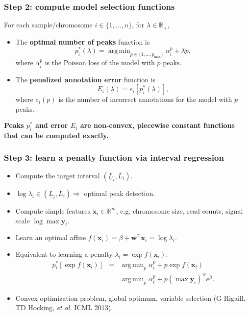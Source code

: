 \documentclass{beamer}
\DeclareMathOperator*{\argmin}{arg\,min}
\DeclareMathOperator*{\minimize}{minimize}
\newcommand{\RR}{\mathbb R}
\begin{document}
\begin{frame}
  \frametitle{Step 2: compute model selection functions}
  For each sample/chromosome $i\in\{1, \dots, n\}$, for $\lambda\in\RR_+$,
  \begin{itemize}
  \item   The \textbf{optimal number of peaks} function is
  \begin{equation*}
    p_i^*(\lambda) = \argmin_{p\in\{1,\dots, p_{\text{max}}\}}
      \alpha_i^p + \lambda p,
  \end{equation*}
  where  $\alpha_i^p$ is the Poisson loss of the model with $p$ peaks.
  \item The \textbf{penalized annotation error} function is
  \begin{equation*}
    E_i(\lambda) = e_i\left[ p_i^*(\lambda) \right],
  \end{equation*}
  where $e_i(p)$ is the number of incorrect annotations for the model
  with $p$ peaks.
  \end{itemize}
  \textbf{Peaks $p_i^*$ and error $E_i$ are non-convex, piecewise
    constant functions that can be computed exactly.}
\end{frame}
 
\begin{frame}
  \frametitle{Step 3: learn a penalty function via interval regression}
  \begin{itemize}
  \item Compute the target interval $(\underline L_i, \overline
    L_i)$.
  \item $\log \lambda_i\in(\underline L_i, \overline L_i) \Rightarrow$
   optimal peak detection.
  \item Compute simple features $\mathbf x_i\in\RR^m$, e.g. chromosome size,
    read counts, signal scale $\log \max \mathbf y_i $.
  \item Learn an optimal affine $f(\mathbf x_i) =
    \beta + \mathbf w^\intercal \mathbf x_i = \log \lambda_i $.
  \item Equivalent to learning a penalty $\lambda_i = \exp
    f(\mathbf x_i)$:
    \begin{eqnarray*}
  p_i^*[\exp f(\mathbf x_i)] 
&=& \argmin_p  \alpha_i^p +  p \exp f(\mathbf x_i) \\
&=& \argmin_p \alpha_i^p + p (\max \mathbf y_i)^w e^\beta.
\end{eqnarray*}
  \item Convex optimization problem, global optimum, variable
    selection (G Rigaill, TD Hocking, \emph{et al.} ICML 2013).
  \end{itemize}
\end{frame}
\end{document}
